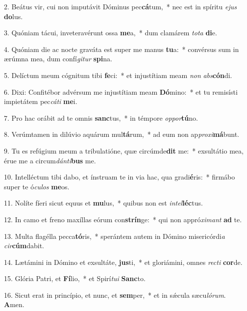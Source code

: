 2. Beátus vir, cui non imputávit Dóminus pec\textbf{cá}tum,~*  nec est in spíritu \textit{e}\textit{jus} \textbf{do}lus.\

3. Quóniam tácui, inveteravérunt ossa \textbf{me}a,~*  dum clamárem \textit{to}\textit{ta} \textbf{di}e.\

4. Quóniam die ac nocte graváta est super me manus \textbf{tu}a:~*  convérsus sum in ærúmna mea, dum confí\textit{gi}\textit{tur} \textbf{spi}na.\

5. Delíctum meum cógnitum tibi \textbf{fe}ci:~*  et injustítiam meam \textit{non} \textit{abs}\textbf{cón}di.\

6. Dixi: Confitébor advérsum me injustítiam meam \textbf{Dó}mino:~*  et tu remisísti impietátem pec\textit{cá}\textit{ti} \textbf{me}i.\

7. Pro hac orábit ad te omnis \textbf{sanc}tus,~*  in témpore \textit{op}\textit{por}\textbf{tú}no.\

8. Verúmtamen in dilúvio aquárum mul\textbf{tá}rum,~*  ad eum non ap\textit{pro}\textit{xi}\textbf{má}bunt.\

9. Tu es refúgium meum a tribulatióne, quæ circúmde\textbf{dit} me:~*  exsultátio mea, érue me a circum\textit{dán}\textit{ti}\textbf{bus} me.\

10. Intelléctum tibi dabo, et ínstruam te in via hac, qua gradi\textbf{é}ris:~*  firmábo super te ó\textit{cu}\textit{los} \textbf{me}os.\

11. Nolíte fíeri sicut equus et \textbf{mu}lus,~*  quibus non est \textit{in}\textit{tel}\textbf{léc}tus.\

12. In camo et freno maxíllas eórum con\textbf{strín}ge:~*  qui non appró\textit{xi}\textit{mant} \textbf{ad} te.\

13. Multa flagélla pecca\textbf{tó}ris,~*  sperántem autem in Dómino misericórdi\textit{a} \textit{cir}\textbf{cúm}dabit.\

14. Lætámini in Dómino et exsultáte, \textbf{jus}ti,~*  et gloriámini, omnes \textit{rec}\textit{ti} \textbf{cor}de.\

15. Glória Patri, et \textbf{Fí}lio,~*  et Spirí\textit{tu}\textit{i} \textbf{Sanc}to.\

16. Sicut erat in princípio, et nunc, et \textbf{sem}per,~*  et in sǽcula sæcu\textit{ló}\textit{rum}. \textbf{A}men.\

